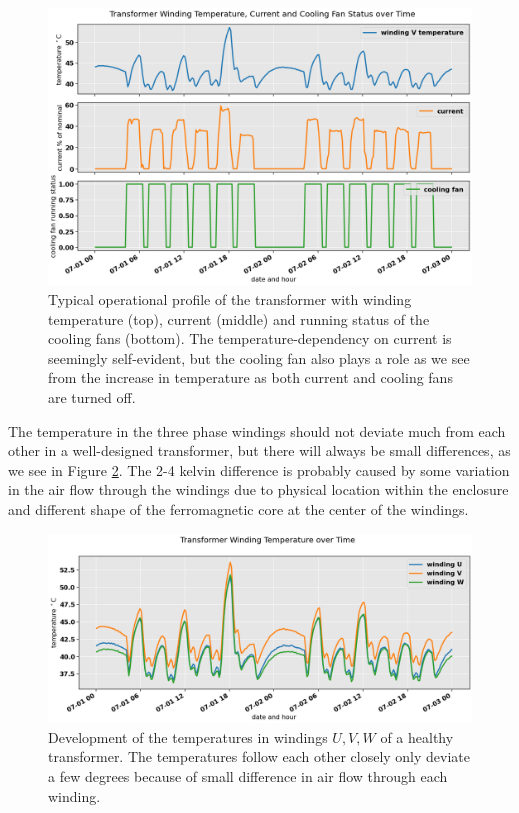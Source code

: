 \documentclass[]{article}
\begin{document}
\begin{figure}[!h]
	\centering
	\includegraphics[width=1\linewidth]{./figs/temp-current-aux.png}
	\caption{Typical operational profile of the transformer with winding temperature (top), current (middle) and running status of the cooling fans (bottom). The temperature-dependency on current is seemingly self-evident, but the cooling fan also plays a role as we see from the increase in temperature as both current and cooling fans are turned off.}
	\label{fig:temp-current-aux}
\end{figure}

The temperature in the three phase windings should not deviate much from each other in a well-designed transformer, but there will always be small differences, as we see in Figure \ref{fig:all-winding-temperature-over-time}. The 2-4 kelvin difference is probably caused by some variation in the air flow through the windings due to physical location within the enclosure and different shape of the ferromagnetic core at the center of the windings.

\begin{figure}[!h]
	\centering
	\includegraphics[width=1\linewidth]{./figs/all-winding-temperature-over-time.png}
	\caption{Development of the temperatures in windings $U,V,W$ of a healthy transformer. The temperatures follow each other closely only deviate a few degrees because of small difference in air flow through each winding.}
	\label{fig:all-winding-temperature-over-time}
\end{figure}
\end{document}
